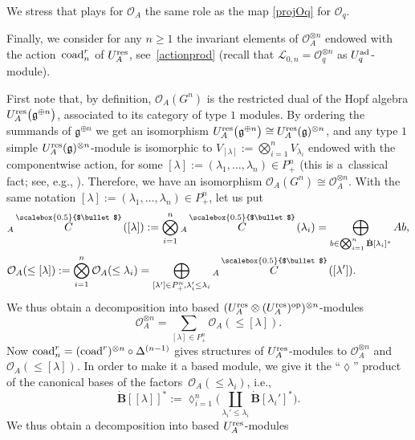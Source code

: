 \documentclass[pdftex]{sigma}
\numberwithin{equation}{section}
\theoremstyle{definition}
\newcommand{\Ll}{{\mathcal L}}
\newcommand{\Oo}{{\mathcal O}}
\newcommand{\smallbullet}{%
\vcenter{\hbox{\,\scalebox{0.5}{$\bullet$}\,}}
}
\begin{document}
We stress that \smash{${}_A \overset{\smallbullet}{\tau}_{\mu,\nu}$} plays for $\Oo_A$ the same role as the map \eqref{projOq} for $\Oo_q$.

Finally, we consider for any $n\geq 1$ the invariant elements of $\Oo_A^{\otimes n}$ endowed with the action~${\rm coad}^r_n$ of $U_A^{\rm res}$, see~\eqref{actionprod} \big(recall that $\Ll_{0,n}=\Oo_q^{\otimes n}$ as $U_q^{\rm ad}$-module\big).

First note that, by definition, $\Oo_A(G^n)$ is the restricted dual of the Hopf algebra $U_A^{\rm res}\big(\mathfrak{g}^{\oplus n}\big)$, associated to its category of type $1$ modules. By ordering the summands of $\mathfrak{g}^{\oplus n}$ we get an isomorphism $U_A^{\rm res}\big(\mathfrak{g}^{\oplus n}\big)\cong U_A^{\rm res}(\mathfrak{g})^{\otimes n}$, and any type $1$ simple $U_A^{\rm res}(\mathfrak{g})^{\otimes n}$-module is isomorphic to ${V_{[\lambda]} := \bigotimes_{i=1}^n V_{\lambda_i}}$ endowed with the componentwise action, for some ${[\lambda] :=(\lambda_1,\dots, \lambda_n)\in P_+^n}$ (this is a~classical fact; see, e.g., \cite[Theorem~3.10.2]{Et}). Therefore, we have an isomorphism ${\Oo_A(G^n)\cong \Oo_A^{\otimes n}}$.
With the same notation $[\lambda]:=(\lambda_1,\dots, \lambda_n)\in P_+^n$, let us put
\begin{align*}%
&{}_A \overset{\raisebox{-1.5pt}{\scriptsize$\smallbullet$}}{C} ([\lambda]) := \bigotimes_{i=1}^n {}_A \overset{\raisebox{-1.5pt}{\scriptsize$\smallbullet$}}{C} (\lambda_i) = \bigoplus_{b\in \bigotimes_{i=1}^n \dot{\mathbf{B}}[\lambda_i]^*} Ab,\\
&\Oo_A(\leq [\lambda]) := \bigotimes_{i=1}^n \Oo_A(\leq \lambda_i)=\bigoplus_{[\lambda'] \in P_+^n, \lambda_i'\leq \lambda_i} {}_A \overset{\raisebox{-1.5pt}{\scriptsize$\smallbullet$}}{C} ([\lambda']).
\end{align*}
We thus obtain a decomposition into based $(U_A^{\rm res}\otimes (U_A^{\rm res})^{\rm op})^{\otimes n}$-modules
\[%
\Oo_A^{\otimes n} = \sum_{[\lambda] \in P_+^n} \Oo_A(\leq [\lambda]).
\]
Now ${\rm coad}_n^r = ({\rm coad}^r)^{\otimes n}\circ \Delta^{(n-1)}$ gives structures of $U_A^{\rm res}$-modules to $\Oo_A^{\otimes n}$ and $\Oo_A(\leq [\lambda])$. In order to make it a based module, we give it the ``$\lozenge$'' product of the canonical bases of the factors~${\Oo_A(\leq \lambda_i)}$, i.e.,
\[\dot{\mathbf{B}} [[\lambda]]^* := \lozenge_{i=1}^n \bigg(\coprod_{\lambda_i'\leq \lambda_i}\dot{\mathbf{B}} [\lambda_i']^*\bigg).\]
We thus obtain a decomposition into based $U_A^{\rm res}$-modules
\end{document}
